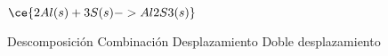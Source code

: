 $\ce{2Al(s) + 3S(s) -> Al2S3(s)}$

\begin{choices}
    \choice Descomposición
    \CorrectChoice Combinación
    \choice Desplazamiento
    \choice Doble desplazamiento
\end{choices}